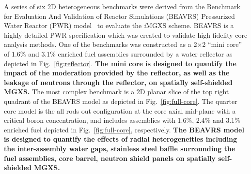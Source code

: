 \documentclass[12pt,twoside]{mitthesis-exec}
\begin{document}
A series of six 2D heterogeneous benchmarks were derived from the Benchmark for Evaluation And Validation of Reactor Simulations (BEAVRS) Pressurized Water Reactor (PWR) model~\cite{horelik2013beavrs} to evaluate the \textit{i}MGXS scheme. BEAVRS is a highly-detailed PWR specification which was created to validate high-fidelity core analysis methods. One of the benchmarks was constructed as a 2$\times$2 ``mini core'' of 1.6\% and 3.1\% enriched fuel assemblies surrounded by a water reflector as depicted in Fig.~\ref{fig:reflector}. \textbf{The mini core is designed to quantify the impact of the moderation provided by the reflector, as well as the leakage of neutrons through the reflector, on spatially self-shielded MGXS.} The most complex benchmark is a 2D planar slice of the top right quadrant of the BEAVRS model as depicted in Fig.~\ref{fig:full-core}. The quarter core model is the all rods out configuration at the core axial mid-plane with a critical boron concentration, and includes assemblies with 1.6\%, 2.4\% and 3.1\% enriched fuel depicted in Fig.~\ref{fig:full-core}, respectively. \textbf{The BEAVRS model is designed to quantify the effects of radial heterogeneities including the inter-assembly water gaps, stainless steel baffle surrounding the fuel assemblies, core barrel, neutron shield panels on spatially self-shielded MGXS.} 



 

\end{document}
